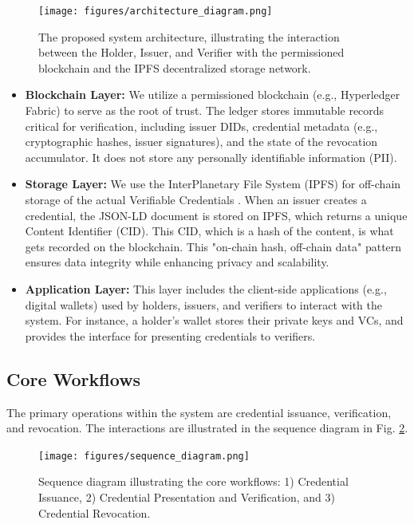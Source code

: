 \documentclass[lettersize,journal]{IEEEtran}
\begin{document}
\begin{figure}[!t]
\centering
\texttt{[image: figures/architecture\_diagram.png]}
\caption{The proposed system architecture, illustrating the interaction between the Holder, Issuer, and Verifier with the permissioned blockchain and the IPFS decentralized storage network.}
\label{fig:architecture}
\end{figure}

\begin{itemize}
    \item \textbf{Blockchain Layer:} We utilize a permissioned blockchain (e.g., Hyperledger Fabric) to serve as the root of trust. The ledger stores immutable records critical for verification, including issuer DIDs, credential metadata (e.g., cryptographic hashes, issuer signatures), and the state of the revocation accumulator. It does not store any personally identifiable information (PII).
    \item \textbf{Storage Layer:} We use the InterPlanetary File System (IPFS) for off-chain storage of the actual Verifiable Credentials \cite{IPFS2023}. When an issuer creates a credential, the JSON-LD document is stored on IPFS, which returns a unique Content Identifier (CID). This CID, which is a hash of the content, is what gets recorded on the blockchain. This "on-chain hash, off-chain data" pattern ensures data integrity while enhancing privacy and scalability.
    \item \textbf{Application Layer:} This layer includes the client-side applications (e.g., digital wallets) used by holders, issuers, and verifiers to interact with the system. For instance, a holder's wallet stores their private keys and VCs, and provides the interface for presenting credentials to verifiers.
\end{itemize}

\subsection{Core Workflows}
The primary operations within the system are credential issuance, verification, and revocation. The interactions are illustrated in the sequence diagram in Fig. \ref{fig:sequence}.

\begin{figure}[!t]
\centering
\texttt{[image: figures/sequence\_diagram.png]}
\caption{Sequence diagram illustrating the core workflows: 1) Credential Issuance, 2) Credential Presentation and Verification, and 3) Credential Revocation.}
\label{fig:sequence}
\end{figure}
\end{document}
